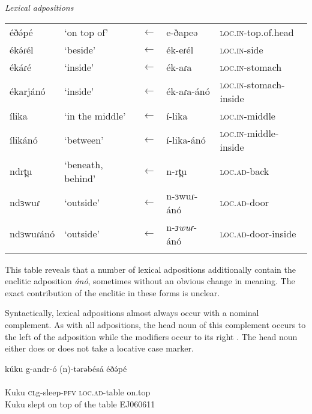 \ea \textit{Lexical adpositions}\\
\begin{tabular}{llcll} %
	\lsptoprule
{éðə́pé} & `on top of' & $\leftarrow$ & {e-ðapeə} & \textsc{loc.in}-top.of.head \\
{ékə́ɾél} & `beside' & $\leftarrow$ &  {ék}-{eɾél} & \textsc{loc.in}-side \\
{ékáɾé} & `inside' & $\leftarrow$ & {ék}-{aɾa} &  \textsc{loc.in}-stomach \\ 
ékarjánó & `inside' & $\leftarrow$ & {ék}-{aɾa}-ánó &  \textsc{loc.in}-stomach-inside \\
{ílika} & `in the middle' & $\leftarrow$ &  {í}-{lika} & \textsc{loc.in}-middle \\
{ílikánó} & `between' & $\leftarrow$ &  {í}-{lika-ánó} & \textsc{loc.in}-middle-inside \\
{ndrt̪u} & `beneath, behind' & $\leftarrow$ &  n-rt̪u & \textsc{loc.ad}-back \\
{ndɜwuɾ} & `outside' & $\leftarrow$ & {n}-{ɜwuɾ}-ánó & \textsc{loc.ad}-door \\
{ndɜwuɾánó} & `outside' & $\leftarrow$ & {n}-\textit{ɜwuɾ}-ánó & \textsc{loc.ad}-door-inside \\
	\lspbottomrule
\end{tabular}
\z 
This table reveals that a number of lexical adpositions additionally contain the enclitic adposition \textit{ánó}, sometimes without an obvious change in meaning. The exact contribution of the enclitic in these forms is unclear.

Syntactically, lexical adpositions almost always occur with a nominal complement. As with all adpositions, the head noun of this complement occurs to the left of the adposition while the modifiers occur to its right . The head noun either does or does not take a locative case marker.

\ea 
\gll kúku g-andr-ó (n)-tərəbésá éðə́pé\\
\\ Kuku \textsc{cl}g-sleep-\textsc{pfv} \textsc{loc.ad}-table on.top\\
\glt Kuku slept on top of the table		\hfill		EJ060611
\z 



